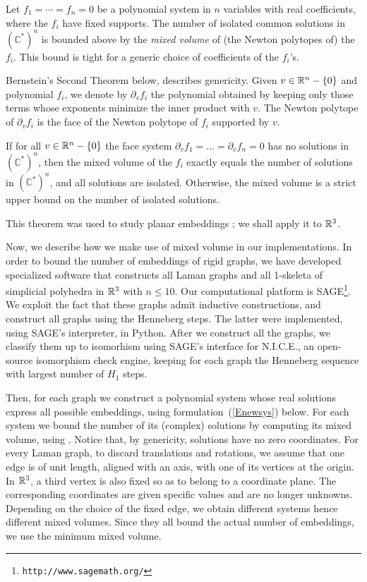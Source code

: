 \documentclass[envcountsame]{llncs}
\begin{document}
\begin{theorem} {\rm \cite{B75}}
Let $f_1=\cdots= f_n=0$ be a polynomial system in $n$ variables with real coefficients,
where the $f_i$ have fixed supports.
  The number of isolated common solutions in $(\mathbb{C}^*)^n$ is bounded above 
  by the {\em mixed volume} of (the Newton polytopes of) the $f_i$.
  This bound is tight for a generic choice of coefficients of the $f_i$'s.
\end{theorem}

Bernstein's Second Theorem below, describes genericity.
Given $v \in {\mathbb R}^n-\{0\}$ and polynomial $f_i$, we denote by $\partial_v f_i$
the polynomial obtained by keeping only those terms whose exponents minimize
the inner product with $v$.
The Newton polytope of $\partial_v f_i$ is the face of the Newton polytope of $f_i$
supported by $v$.

\begin{theorem}\label{Bernstein2nd} {\rm \cite{B75}}
  If for all $v \in {\mathbb R}^n-\{0\}$ the face system
  $\partial_vf_1=\ldots=\partial_vf_n=0$ has no solutions in $(\mathbb{C^*})^n$,
then the mixed volume of the $f_i$ exactly equals the number of
solutions in $(\mathbb{C^*})^n$, and all solutions are isolated.
Otherwise, the mixed volume is a strict upper bound on the number of isolated solutions.
\end{theorem}

This theorem was used to study planar embeddings \cite{ST08}; we shall apply it to ${\mathbb R}^3$.

Now, we describe how we make use of mixed volume in our implementations.
In order to bound the number of embeddings of rigid graphs, we have
developed specialized software that constructs all Laman graphs 
and all 1-skeleta of simplicial polyhedra in ${\mathbb R}^3$ with $n\le 10$.
Our computational platform is SAGE\footnote{\texttt{http://www.sagemath.org/}}.
We exploit the fact that these graphs admit inductive constructions, and
construct all graphs using the  Henneberg steps.
The latter were implemented, using SAGE's interpreter, in Python. 
After we construct all the graphs, we classify them up to isomorhism 
using SAGE's interface for N.I.C.E., an open-source isomorphism check engine,
keeping for each graph the Henneberg sequence with largest number of $H_1$ steps.
 
Then, for each graph we construct a polynomial system whose real solutions express all possible embeddings,
using formulation~(\ref{Enewsys}) below.
For each system we bound the number of its (complex) solutions by computing its
mixed volume, using \cite{EmCa95}.
Notice that, by genericity, solutions have no zero coordinates.
For every Laman graph, to discard translations and rotations,
we assume that one edge is of unit length, 
aligned with an axis, with one of its vertices at the origin.
In ${\mathbb R}^3$, a third vertex is also fixed so as to belong to a coordinate plane.
The corresponding coordinates are given specific values and are no longer unknowns.
Depending on the choice of the fixed edge, we obtain different systems hence different
mixed volumes. Since they all bound the actual number of embeddings,
we use the minimum mixed volume.  
\end{document}

